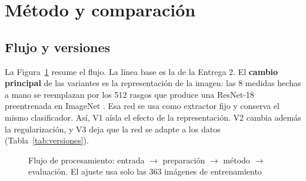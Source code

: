 \documentclass[pdflatex,sn-mathphys-num]{sn-jnl}%
\theoremstyle{thmstyleone}%
\theoremstyle{thmstyletwo}%
\theoremstyle{thmstylethree}%
\begin{document}
\FloatBarrier
\section{Método y comparación}\label{sec:metodo}

\subsection{Flujo y versiones}

La Figura~\ref{fig:flujo} resume el flujo. La línea base es la de la Entrega 2. El \textbf{cambio principal} de las variantes es la representación de la imagen: las 8 medidas hechas a mano se reemplazan por los 512 rasgos que produce una ResNet-18 \cite{he2016resnet} preentrenada en ImageNet \cite{deng2009imagenet}. Esa red se usa como extractor fijo y conserva el mismo clasificador. Así, V1 aísla el efecto de la representación. V2 cambia además la regularización, y V3 deja que la red se adapte a los datos (Tabla~\ref{tab:versiones}).

\begin{figure}[htbp]
\centering
{}
\caption{Flujo de procesamiento: entrada $\rightarrow$ preparación $\rightarrow$ método $\rightarrow$ evaluación. El ajuste usa solo las 363 imágenes de entrenamiento}\label{fig:flujo}
\end{figure}
\end{document}
